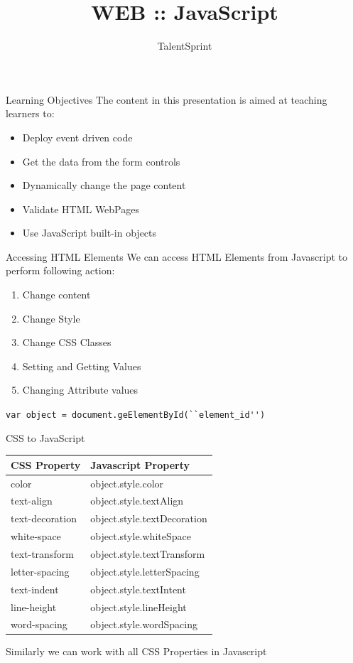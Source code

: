 \documentclass[14pt]{beamer}
\title{WEB :: JavaScript}
\author[TS]{TalentSprint}
\institute[L\&D]{Licensed To Skill}
\begin{document}
\begin{frame}
  \titlepage
\end{frame}

\begin{frame}{Learning Objectives}
The content in this presentation is aimed at teaching  learners to:
  \begin{itemize}
  \item Deploy event driven code
  \item Get the data from the form controls
  \item Dynamically change the page content
  \item Validate HTML WebPages
  \item Use JavaScript built-in objects 
  \end{itemize}
\end{frame}

\begin{frame}{Accessing HTML Elements}
We can access HTML Elements from Javascript to perform following action:
\begin{enumerate}
 \item Change content
 \item Change Style 
 \item Change CSS Classes
 \item Setting and Getting Values
 \item Changing Attribute values
\end{enumerate}
\begin{block}{}
\lstinline!var object = document.geElementById(``element_id'')!
\end{block}
\end{frame}

\begin{frame}{CSS to JavaScript}
\begin{tabular}{|p{4cm} | p{6.5cm} |}
\hline \textbf{CSS Property} & \textbf{Javascript Property} \\ \hline
color & object.style.color \\ \hline
text-align & object.style.textAlign \\ \hline
text-decoration  & object.style.textDecoration \\ \hline
white-space & object.style.whiteSpace \\ \hline
text-transform & object.style.textTransform \\ \hline
letter-spacing & object.style.letterSpacing \\ \hline
text-indent & object.style.textIntent \\ \hline
line-height & object.style.lineHeight \\ \hline
word-spacing & object.style.wordSpacing \\ \hline
\end{tabular}
Similarly we can work with all CSS Properties in Javascript
\end{frame}
\end{document}
